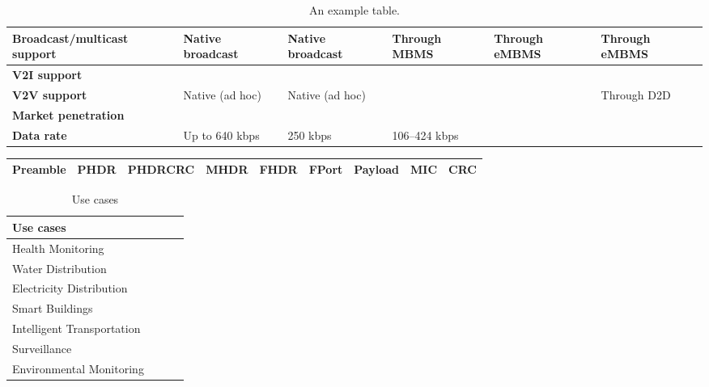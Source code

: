 \begin{table}[h!]
\begin{center}
\begin{tabulary}{\textwidth}{L|L|L|L|L|L}
	\bf{Broadcast/multicast support} & Native broadcast                                      & Native broadcast                                      & Through MBMS                     & Through eMBMS            & Through eMBMS             \\\hline
	\bf{V2I support}                 & \ok                                                   & \ok                                                   & \ok                              & \ok                      & \ok                       \\\hline
	\bf{V2V support}                 & Native (ad hoc)                                       & Native (ad hoc)                                       & \ko                              & \ko                      & Through D2D               \\\hline
	\bf{Market penetration}          & \ok                                                   & \ko                                                   & \ok                              & \ok                      & \ok                       \\\hline
	\bf{Data rate}                   & Up to 640 kbps                                        & 250 kbps                                              & 106–424 kbps                              & \ok                      & \ok                       \\\hline
	\end{tabulary}
	\caption{\label{tab:Tabliutecv} An example table.}
\end{center}
\end{table}

\begin{tabulary}{\textwidth}{|C|C|C|C|C|C|C|C|C|}\hline
	Preamble & PHDR & PHDRCRC & MHDR & FHDR & FPort & Payload & MIC & CRC \\\hline
\end{tabulary}

\begin{table}[h!]
\begin{center}
	\begin{tabular}{l|l|l|l}
	\textbf{Use cases}         &  &  & \\\hline
	Health Monitoring          &  &  & \\\hline
	Water Distribution         &  &  & \\\hline
	Electricity Distribution   &  &  & \\\hline
	Smart Buildings            &  &  & \\\hline
	Intelligent Transportation &  &  & \\\hline
	Surveillance               &  &  & \\\hline
	Environmental Monitoring   &  &  & \\
	\end{tabular}
	\caption{\label{tab:IoTUseCase} Use cases \cite{hancke_role_2012}}
\end{center}
\end{table}

